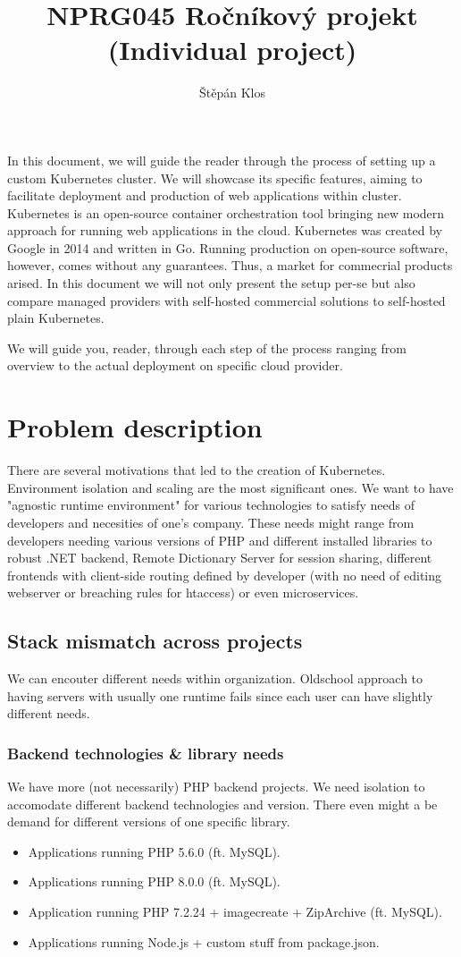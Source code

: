 \documentclass{article}
\title{NPRG045 Ročníkový projekt (Individual project)}
\author{Štěpán Klos}
\date{}
\begin{document}
\maketitle

In this document, we will guide the reader through the process of setting up a custom Kubernetes cluster. We will showcase its specific features, aiming to facilitate deployment and production of web applications within cluster.
\bigbreak
Kubernetes is an open-source container orchestration tool bringing new modern approach for running web applications in the cloud. Kubernetes was created by Google in 2014 and written in Go. Running production on open-source software, however, comes without any guarantees. Thus, a market for commecrial products arised. In this document we will not only present the setup per-se but also compare managed providers with self-hosted commercial solutions to self-hosted plain Kubernetes. \par
\bigbreak
We will guide you, reader, through each step of the process ranging from overview to the actual deployment on specific cloud provider.   

\section{Problem description}
There are several motivations that led to the creation of Kubernetes. Environment isolation and scaling are the most significant ones. We want to have "agnostic runtime environment" for various technologies to satisfy needs of developers and necesities of one's company. These needs might range from developers needing various versions of PHP and different installed libraries to robust .NET backend, Remote Dictionary Server for session sharing, different frontends with client-side routing defined by developer (with no need of editing webserver or breaching rules for htaccess) or even microservices. 
\subsection{Stack mismatch across projects}
We can encouter different needs within organization. Oldschool approach to having servers with usually one runtime fails since each user can have slightly different needs.
\subsubsection{Backend technologies \& library needs}
We have more (not necessarily) PHP backend projects. We need isolation to accomodate different backend technologies and version. There even might a be demand for different versions of one specific library.
\begin{itemize}
  \item Applications running PHP 5.6.0 (ft. MySQL).
  \item Applications running PHP 8.0.0 (ft. MySQL).
  \item Application running PHP 7.2.24 + imagecreate + ZipArchive (ft. MySQL).
  \item Applications running Node.js + custom stuff from package.json.
\end{itemize}
\end{document}
